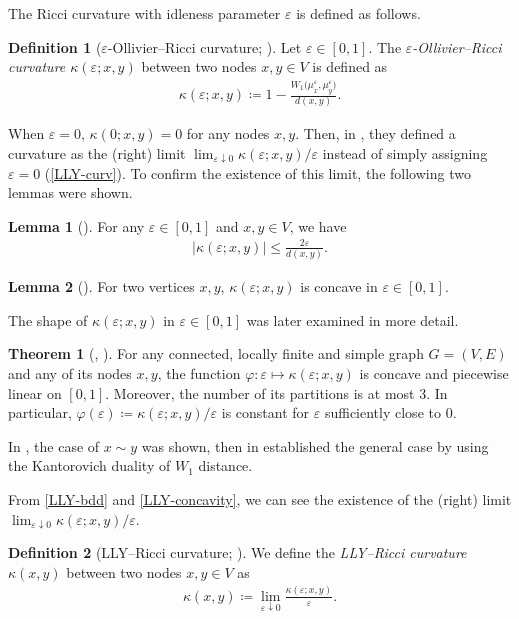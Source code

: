 \documentclass{article}
\numberwithin{equation}{section}
\theoremstyle{definition}
\newtheorem{definition}{Definition}[section]
\newtheorem{thm}[thm]{Theorem}
\newtheorem{lemma}[lemma]{Lemma}
\newcommand{\K}{\kappa}
\newcommand{\eps}{\varepsilon} %
\newcommand{\dto}{\downarrow}
\newcommand{\wxy}{W_1\big(\mu_x^\eps,\mu_y^\eps\big)}
\newcommand{\kexy}{\kappa(\eps;x,y)}
\newcommand{\kxy}{\kappa(x,y)}
\def\:={\coloneqq} %
\begin{document}
\begin{appendices}
The Ricci curvature with idleness parameter $\eps$ is defined as follows.

\begin{definition}[$\eps$-Ollivier--Ricci curvature; \cite{Ol,LLY}] \label{eps-curv}
Let $\eps\in[0,1]$.
The \emph{$\eps$-Ollivier--Ricci curvature $\kexy$} between two nodes $x,y\in V$ is defined as 
\begin{align*}
\kexy\:=1-\frac{\wxy}{d(x,y)}.
\end{align*}
\end{definition}

When $\eps=0$, $\K(0;x,y)=0$ for any nodes $x,y$.
Then, in \cite{LLY}, they defined a curvature as the (right) limit $\lim_{\eps\dto0}\kexy/\eps$ instead of simply assigning $\eps=0$ (\autoref{LLY-curv}).
To confirm the existence of this limit, the following two lemmas were shown.

\begin{lemma}[{\cite[Lemma 2.2]{LLY}}] \label{LLY-bdd}
For any $\eps\in[0,1]$ and $x,y\in V$, we have
\begin{align*}
|\kexy|\leq\frac{2\eps}{d(x,y)}. %
\end{align*}
\end{lemma}

\begin{lemma}[{\cite[Lemma 2.1]{LLY}}] \label{LLY-concavity}
For two vertices $x,y$, $\K(\eps;x,y)$ is concave in $\eps\in[0,1]$.
\end{lemma}

The shape of $\K(\eps;x,y)$ in $\eps\in[0,1]$ was later examined in more detail.

\begin{thm}[{\cite[Theorem 3.4]{BCLMP}, \cite[Theorem 3.2]{CK}}] \label{3-pieces}
For any connected, locally finite and simple graph $G=(V,E)$ and any of its nodes $x,y$, the function $\varphi:\eps\mapsto\kexy$ is concave and piecewise linear on $[0,1]$.
Moreover, the number of its partitions is at most $3$.
In particular, $\varphi(\eps)\:=\kexy/\eps$ is constant for $\eps$ sufficiently close to $0$.
\end{thm}

In \cite{BCLMP}, the case of $x\sim y$ was shown, then in \cite{CK} established the general case by using the Kantorovich duality of $W_1$ distance.

From \autoref{LLY-bdd} and \autoref{LLY-concavity}, we can see the existence of the (right) limit $\lim_{\eps\dto0}\kexy/\eps$.

\begin{definition}[LLY--Ricci curvature; \cite{LLY}] \label{LLY-curv}
We define the \emph{LLY--Ricci curvature} $\kxy$ between two nodes $x,y\in V$ as
\begin{align*}
\kxy\:=\lim_{\eps\dto0}\frac{\kexy}{\eps}. 
\end{align*}
\end{definition}


\end{appendices}
\end{document}
